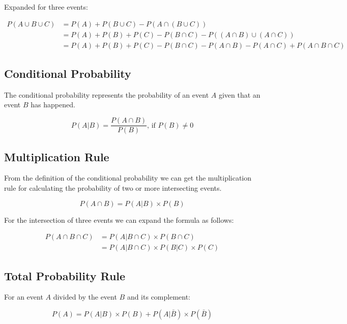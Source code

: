 \documentclass[12pt]{article}
\begin{document}
	\noindent Expanded for three events:

	\begin{align*}
		P(A\cup B\cup C) &= P(A) + P(B\cup C) - P(A\cap (B\cup C)) \\
		&= P(A) + P(B) + P(C) - P(B\cap C) - P((A\cap B)\cup (A\cap C)) \\
		&= P(A) + P(B) + P(C)- P(B\cap C) - P(A\cap B) - P(A\cap C) + P(A\cap B\cap C)
	\end{align*}
	
	\subsection{Conditional Probability}
	
	The conditional probability represents the probability of an event \(A\) given that an event \(B\) has happened.

	\begin{equation*}
		P(A|B)=\frac{P(A\cap B)}{P(B)}\text{, if }P(B)\neq 0
	\end{equation*}
	
	\subsection{Multiplication Rule}
	
	From the definition of the conditional probability we can get the multiplication rule for calculating the probability of two or more intersecting events.

	\begin{equation*}
		P(A\cap B)=P(A|B)\times P(B)
	\end{equation*}
	
	\noindent For the intersection of three events we can expand the formula as follows:

	\begin{align*}
		P(A\cap B\cap C) &= P(A|B\cap C)\times P(B\cap C) \\
		&= P(A|B\cap C)\times P(B|C)\times P(C)
	\end{align*}
	
	\subsection{Total Probability Rule}
	
	For an event \(A\) divided by the event \(B\) and its complement:

	\begin{equation*}
		P(A)=P(A|B)\times P(B)+P(A|\bar{B})\times P(\bar{B})
	\end{equation*}
	
\end{document}
